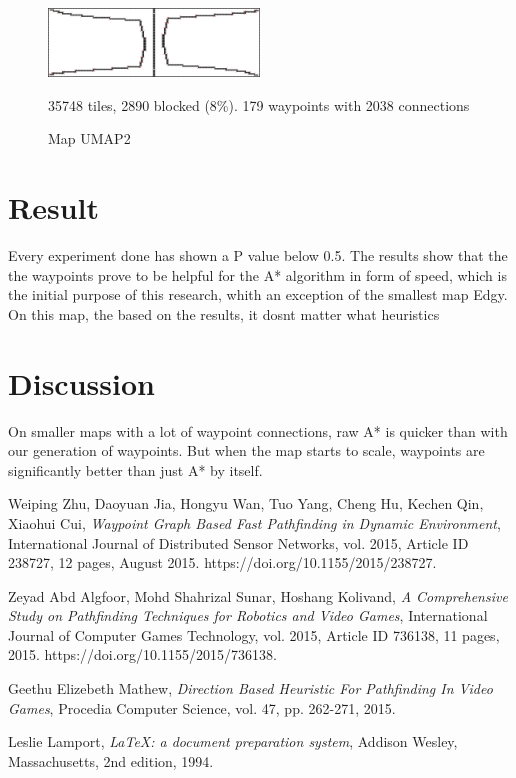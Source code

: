 \documentclass[a4paper]{article}
\begin{document}
\begin{figure}[t!]
\centering
\includegraphics[width=0.5\textwidth,height=\textheight,keepaspectratio]{Data/UMAP2.png}
\caption{Map UMAP2}
35748 tiles, 2890 blocked (8\%). 179 waypoints with 2038 connections
\label{fig:UMAP2}
\end{figure}

\section{Result}
Every experiment done has shown a P value below 0.5. The results show that the the waypoints prove to be helpful for the A* algorithm in form of speed, which is the initial purpose of this research, whith an exception of the smallest map Edgy.
On this map, the based on the results, it dosnt matter what heuristics 


\section{Discussion}
On smaller maps with a lot of waypoint connections, raw A* is quicker than with our generation of waypoints. But when the map starts to scale, waypoints are significantly better than just A* by itself.

\newpage
\begin{thebibliography}{9}

  Weiping Zhu, Daoyuan Jia, Hongyu Wan, Tuo Yang, Cheng Hu, Kechen Qin, Xiaohui Cui,
  \textit{Waypoint Graph Based Fast Pathfinding in Dynamic Environment},
  International Journal of Distributed Sensor Networks, vol. 2015, Article ID 238727, 12 pages,
  August 2015. https://doi.org/10.1155/2015/238727.

  Zeyad Abd Algfoor, Mohd Shahrizal Sunar, Hoshang Kolivand,
  \textit{A Comprehensive Study on Pathfinding Techniques for Robotics and Video Games},
  International Journal of Computer Games Technology, vol. 2015, Article ID 736138, 11 pages,
  2015. https://doi.org/10.1155/2015/736138.

  Geethu Elizebeth Mathew,
  \textit{Direction Based Heuristic For Pathfinding In Video Games},
  Procedia Computer Science, vol. 47, pp. 262-271,
  2015.

  Leslie Lamport,
  \textit{\LaTeX: a document preparation system},
  Addison Wesley, Massachusetts,
  2nd edition,
  1994.

\end{thebibliography}
\end{document}
